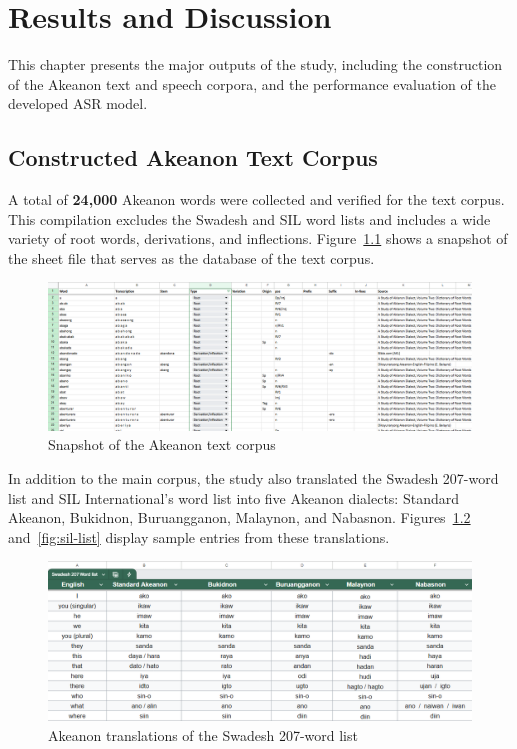 \chapter{Results and Discussion}

This chapter presents the major outputs of the study, including the construction of the Akeanon text and speech corpora, and the performance evaluation of the developed ASR model.

\section{Constructed Akeanon Text Corpus}

A total of \textbf{24,000} Akeanon words were collected and verified for the text corpus. This compilation excludes the Swadesh and SIL word lists and includes a wide variety of root words, derivations, and inflections. Figure~\ref{fig:text-corpus} shows a snapshot of the sheet file that serves as the database of the text corpus.

\begin{figure}[H]
    \centering
    \includegraphics[width=\textwidth]{./figures/text-corpus.png}
    \caption{Snapshot of the Akeanon text corpus}
    \label{fig:text-corpus}
\end{figure}

In addition to the main corpus, the study also translated the Swadesh 207-word list and SIL International's word list into five Akeanon dialects: Standard Akeanon, Bukidnon, Buruangganon, Malaynon, and Nabasnon. Figures~\ref{fig:swadesh-list} and~\ref{fig:sil-list} display sample entries from these translations.

\begin{figure}[H]
    \centering
    \includegraphics[width=\textwidth]{./figures/swadesh.png}
    \caption{Akeanon translations of the Swadesh 207-word list}
    \label{fig:swadesh-list}
\end{figure}

